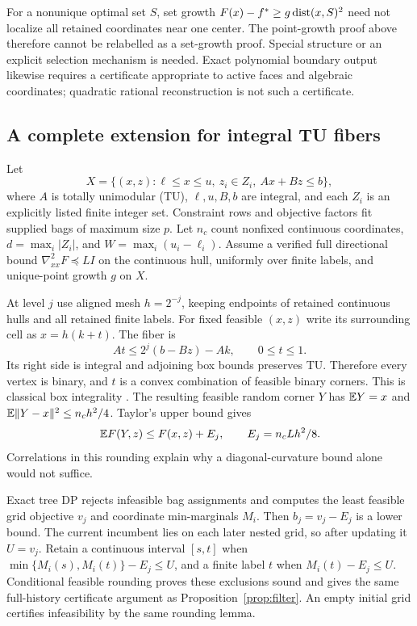 For a nonunique optimal set $S$, set growth
$F(x)-f^*\ge g\operatorname{dist}(x,S)^2$ need not localize all retained coordinates
near one center. The point-growth proof above therefore cannot be
relabelled as a set-growth proof. Special structure or an explicit
selection mechanism is needed. Exact polynomial boundary output likewise
requires a certificate appropriate to active faces and algebraic
coordinates; quadratic rational reconstruction is not such a certificate.

\subsection{A complete extension for integral TU fibers}
Let
\[
X=\{(x,z):\ell\le x\le u,\ z_i\in Z_i,\ Ax+Bz\le b\},
\]
where $A$ is totally unimodular (TU), $\ell,u,B,b$ are integral, and
each $Z_i$ is an explicitly listed finite integer set. Constraint rows
and objective factors fit supplied bags of maximum size $p$. Let $n_c$
count nonfixed continuous coordinates, $d=\max_i|Z_i|$, and
$W=\max_i(u_i-\ell_i)$. Assume a verified full directional bound
$\nabla^2_{xx}F\preceq LI$ on the continuous hull, uniformly over
finite labels, and unique-point growth $g$ on $X$.

At level $j$ use aligned mesh $h=2^{-j}$, keeping endpoints of retained
continuous hulls and all retained finite labels. For fixed feasible
$(x,z)$ write its surrounding cell as $x=h(k+t)$. The fiber is
\[
At\le2^j(b-Bz)-Ak,\qquad0\le t\le1.
\]
Its right side is integral and adjoining box bounds preserves TU.
Therefore every vertex is binary, and $t$ is a convex combination of
feasible binary corners. This is classical box integrality
\cite{ChervetGrappeRobert2018}. The resulting feasible random corner
$Y$ has $\mathbb E Y=x$ and $\mathbb E\lVert Y-x\rVert^2\le n_ch^2/4$. Taylor's upper
bound gives
\begin{equation}\label{eq:tuerror}
\mathbb E F(Y,z)\le F(x,z)+E_j,\qquad E_j=n_cLh^2/8.
\end{equation}
Correlations in this rounding explain why a diagonal-curvature bound
alone would not suffice.

Exact tree DP rejects infeasible bag assignments and computes the least
feasible grid objective $v_j$ and coordinate min-marginals $M_i$.
Then $b_j=v_j-E_j$ is a lower bound. The current incumbent lies on each
later nested grid, so after updating it $U=v_j$. Retain a continuous
interval $[s,t]$ when $\min\{M_i(s),M_i(t)\}-E_j\le U$, and a
finite label $t$ when $M_i(t)-E_j\le U$. Conditional feasible rounding
proves these exclusions sound and gives the same full-history
certificate argument as Proposition~\ref{prop:filter}. An empty initial
grid certifies infeasibility by the same rounding lemma.

